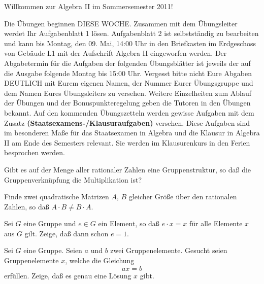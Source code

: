 \documentclass{algsheet}
\author{Dipl.-Math.~Franz Vogler}
\date{02.~Mai 2011}
\begin{document}
                \maketitle


\noindent
Willkommen zur Algebra II im Sommersemester 2011!
\vspace{2ex}
 
Die Übungen beginnen DIESE WOCHE. Zusammen mit dem Übungsleiter werdet Ihr Aufgabenblatt 1 lösen. 
\newline
Aufgabenblatt 2 ist selbstständig zu bearbeiten und kann bis Montag, den 09. Mai, 14:00 Uhr in den Briefkasten im Erdgeschoss von Gebäude L1 mit der Aufschrift \glqq Algebra II\grqq\; eingeworfen werden. Der Abgabetermin für die Aufgaben der folgenden Übungsblätter ist jeweils der auf die Ausgabe folgende Montag bis 15:00 Uhr.   
\newline 
Vergesst bitte nicht Eure Abgaben DEUTLICH mit Eurem eigenen Namen, der Nummer Eurer Übungsgruppe und dem Namen Eures Übungsleiters zu versehen. Weitere Einzelheiten zum Ablauf der Übungen und der Bonuspunkteregelung geben die Tutoren in den Übungen bekannt.
\newline
Auf den kommenden Übungszetteln werden gewisse Aufgaben mit dem Zusatz 
\newline \glqq \textbf{(Staatsexamens-/Klausuraufgaben)}\grqq\; versehen. Diese Aufgaben sind im be\-sonderen Maße für das Staatsexamen in Algebra und die Klausur in Algebra II am Ende des Semesters relevant. Sie werden im Klausurenkurs in den Ferien besprochen werden.  
 

\begin{exercise}
    Gibt es auf der Menge aller rationaler Zahlen eine Gruppenstruktur, so daß
    die Gruppenverknüpfung die Multiplikation ist?
\end{exercise}

\begin{exercise}
    Finde zwei quadratische Matrizen \(A\), \(B\) gleicher Größe über den
    rationalen Zahlen, so daß \(A \cdot B \neq B \cdot A\).
\end{exercise}

\begin{exercise}
    Sei \(G\) eine Gruppe und \(e \in G\) ein Element, so daß \(e \cdot x = x\)
    für alle Elemente \(x\) aus \(G\) gilt. Zeige, daß dann schon \(e = 1\).
\end{exercise}

\begin{exercise}
    Sei \(G\) eine Gruppe. Seien \(a\) und \(b\) zwei Gruppenelemente. Gesucht
    seien Gruppenelemente \(x\), welche die Gleichung
    \begin{equation}
        a x = b
    \end{equation}
    erfüllen. Zeige, daß es genau eine Lösung \(x\) gibt.
\end{exercise}
\end{document}
